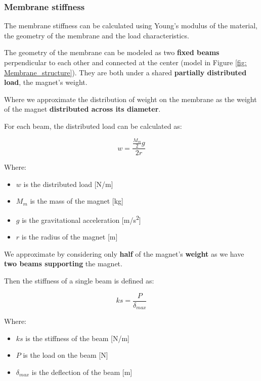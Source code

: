 \subsubsection{Membrane stiffness}
\label{sec: Membrane_stiffness}
The membrane stiffness can be calculated using Young's modulus of the material, the geometry of the membrane and the load characteristics.

The geometry of the membrane can be modeled as two \textbf{fixed beams} perpendicular to each other and connected at the center (model in Figure \ref{fig: Membrane_structure}).
They are both under a shared \textbf{partially distributed load}, the magnet's weight.

Where we approximate the distribution of weight on the membrane as the weight of the magnet \textbf{distributed across its diameter}.

\begin{samepage}
    For each beam, the distributed load can be calculated as:
    \nopagebreak

    \begin{equation*}
        w = \frac{\frac{M_{m}}{2} g}{2 r}
    \end{equation*}
    \nopagebreak

    Where:
    \nopagebreak

    \begin{itemize}
        \item $w$ is the distributed load [N/m]
        \item $M_m$ is the mass of the magnet [kg]
        \item $g$ is the gravitational acceleration [m/s\textsuperscript{2}]
        \item $r$ is the radius of the magnet [m]
    \end{itemize}
\end{samepage}


We approximate by considering only \textbf{half} of the magnet's \textbf{weight} as we have \textbf{two beams supporting} the magnet.

\begin{samepage}
    Then the stiffness of a single beam is defined as:
    \nopagebreak

    \begin{equation*}
        ks = \frac{P}{\delta_{max}}
    \end{equation*}
    \nopagebreak

    Where:
    \nopagebreak

    \begin{itemize}
        \item $ks$ is the stiffness of the beam [N/m]
        \item $P$ is the load on the beam [N]
        \item $\delta_{max}$ is the deflection of the beam [m]
    \end{itemize}
\end{samepage}

